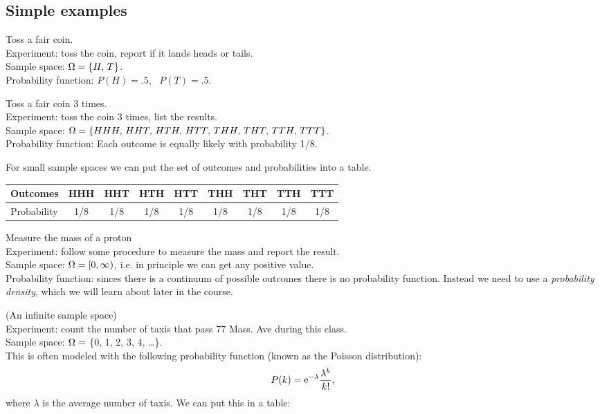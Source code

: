 \subsection{Simple examples}
\numexamp Toss a fair  coin.\\
Experiment: toss the coin, report if it lands heads or tails.\\
Sample space: $\Omega = \{H,\, T\}$.\\
Probability function: $P(H) = .5$, \, $P(T) = .5$.

\medskip

\numexamp Toss a fair  coin 3 times.\\
Experiment: toss the coin 3 times, list the results.\\
Sample space: $\Omega = \{HHH, \, HHT, \, HTH, \, HTT, \, THH, \, THT, \, TTH, \, TTT\}$.\\
Probability function: Each outcome is equally likely with probability 1/8.

For small sample spaces we can put the set of outcomes and probabilities into
a table.

\begin{tabular}{l|cccccccc}
Outcomes    & HHH & HHT & HTH & HTT & THH & THT & TTH & TTT\\
\hline
Probability & 1/8 & 1/8 & 1/8 & 1/8 & 1/8 & 1/8 & 1/8 & 1/8
\end{tabular}
\medskip

\numexamp Measure the mass of a proton\\
Experiment: follow some procedure to measure the mass and report the result.\\
Sample space: $\Omega = [0,\infty)$, i.e. in principle we can get any positive value.\\
Probability function: sinces there is a continuum of possible outcomes there
is no probability function. Instead we need to use a 
\emph{probability density}, which we will learn about
later in the course.

\medskip

\numexamp (An infinite sample space)\\
Experiment: count the number of taxis that pass 77 Mass. Ave
during this class.\\
Sample space: $\Omega = $ \{0, 1, 2, 3, 4, \ldots\}.\\
This is often modeled with the following probability function (known as the
Poisson distribution):\\
\[\displaystyle{P(k) = \mathrm{e}^{-\lambda}\frac{\lambda^k}{k!}},\]
where $\lambda$ is the average number of taxis. 
We can put this in a table:

